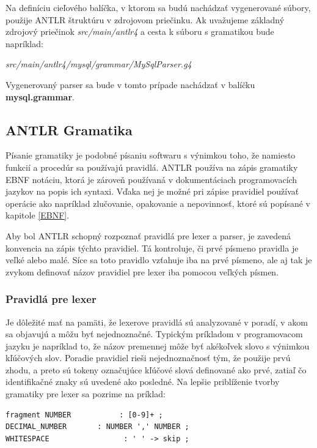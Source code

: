 Na definíciu cieľového balíčka, v ktorom sa budú nachádzať vygenerované súbory, použije \mbox{ANTLR}  štruktúru v zdrojovom priečinku. Ak uvažujeme základný zdrojový priečinok \textit{src/main/antlr4} a cesta k súboru s gramatikou bude napríklad:

\begin{center}
\textit{src/main/antlr4/mysql/grammar/MySqlParser.g4}
\end{center}

Vygenerovaný parser sa bude v tomto prípade nachádzať v balíčku \textbf{mysql.grammar}.

\subsection{ANTLR Gramatika}\label{antlr_grammar}
Písanie gramatiky je podobné písaniu softwaru s výnimkou toho, že namiesto funkcií a procedúr sa používajú pravidlá. ANTLR používa na zápis gramatiky EBNF notáciu, ktorá je zároveň používaná v dokumentáciach programovacích jazykov na popis ich syntaxi. Vďaka nej je možné pri zápise pravidiel používať operácie ako napríklad zlučovanie, opakovanie a nepovinnosť, ktoré sú popísané v kapitole \ref{EBNF}.

Aby bol ANTLR schopný rozpoznať pravidlá pre lexer a parser, je zavedená konvencia na zápis týchto pravidiel. Tá kontroluje, či prvé písmeno pravidla je veľké alebo malé. Síce sa toto pravidlo vzťahuje iba na prvé písmeno, ale aj tak je zvykom definovať názov pravidiel pre lexer iba pomocou veľkých písmen. 

\subsubsection{Pravidlá pre lexer}
Je dôležité mať na pamäti, že lexerove pravidlá sú analyzované v poradí, v akom sa objavujú a môžu byť nejednoznačné. Typickým príkladom v programovacom jazyku je napríklad to, že názov premennej môže byť akékoľvek slovo s výnimkou kľúčových slov. Poradie pravidiel rieši nejednoznačnosť tým, že použije prvú zhodu, a preto sú tokeny označujúce kľúčové slová definované ako prvé, zatiaľ čo identifikačné znaky sú uvedené ako posledné. Na lepšie priblíženie tvorby gramatiky pre lexer sa pozrime na príklad:

\begin{lstlisting}[basicstyle=\small, keepspaces=true]
fragment NUMBER           : [0-9]+ ;
DECIMAL_NUMBER       : NUMBER ',' NUMBER ;
WHITESPACE                 : ' ' -> skip ;
\end{lstlisting}

